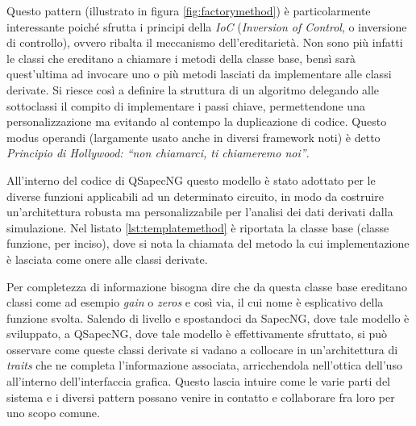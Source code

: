 Questo pattern (illustrato in figura \ref{fig:factorymethod}) è particolarmente interessante poiché sfrutta i principi della \textit{IoC} (\textit{Inversion of Control}, o inversione di controllo), ovvero ribalta il meccanismo dell'ereditarietà. Non sono più infatti le classi che ereditano a chiamare i metodi della classe base, bensì sarà quest'ultima ad invocare uno o più metodi lasciati da implementare alle classi derivate. Si riesce così a definire la struttura di un algoritmo delegando alle sottoclassi il compito di implementare i passi chiave, permettendone una personalizzazione ma evitando al contempo la duplicazione di codice. Questo modus operandi (largamente usato anche in diversi framework noti) è detto \textit{Principio di Hollywood: ``non chiamarci, ti chiameremo noi''}.

All'interno del codice di QSapecNG questo modello è stato adottato per le diverse funzioni applicabili ad un determinato circuito, in modo da costruire un'architettura robusta ma personalizzabile per l'analisi dei dati derivati dalla simulazione. Nel listato \ref{lst:templatemethod} è riportata la classe base (classe funzione, per inciso), dove si nota la chiamata del metodo la cui implementazione è lasciata come onere alle classi derivate.

Per completezza di informazione bisogna dire che da questa classe base ereditano classi come ad esempio \textit{gain} o \textit{zeros} e così via, il cui nome è esplicativo della funzione svolta. Salendo di livello e spostandoci da SapecNG, dove tale modello è sviluppato, a QSapecNG, dove tale modello è effettivamente sfruttato, si può osservare come queste classi derivate si vadano a collocare in un'architettura di \textit{traits} che ne completa l'informazione associata, arricchendola nell'ottica dell'uso all'interno dell'interfaccia grafica. Questo lascia intuire come le varie parti del sistema e i diversi pattern possano venire in contatto e collaborare fra loro per uno scopo comune.
